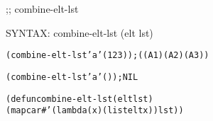 
\begin{aibox}{\function}
;; combine-elt-lst

SYNTAX: combine-elt-lst (elt lst)
\end{aibox}

\begin{aibox}{\examples}

\begin{alltt}
(combine-elt-lst 'a '(1 2 3)); ((A 1) (A 2) (A 3))

(combine-elt-lst 'a '()); NIL
\end{alltt}

\end{aibox}

\begin{aibox}{\comments}
\end{aibox}
\begin{aibox}{\answers}

\end{aibox}
\begin{aibox}{\othercomments}

\end{aibox}
\begin{aibox}{\pseudocode}

\end{aibox}
\begin{aibox}{\code}

\begin{alltt}

(defun combine-elt-lst (elt lst)
            (mapcar #'(lambda (x) (list elt x)) lst))

\end{alltt}
\end{aibox}

